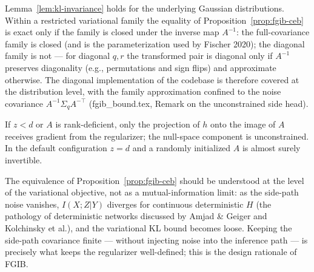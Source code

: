 \begin{remark}\label{rem:closure}
Lemma~\ref{lem:kl-invariance} holds for the underlying Gaussian distributions. Within a
restricted variational family the equality of Proposition~\ref{prop:fgib-ceb} is exact
only if the family is closed under the inverse map $A^{-1}$: the full-covariance family
is closed (and is the parameterization used by Fischer 2020); the diagonal family is not
--- for diagonal $q, r$ the transformed pair is diagonal only if $A^{-1}$ preserves
diagonality (e.g., permutations and sign flips) and approximate otherwise. The diagonal
implementation of the codebase is therefore covered at the distribution level, with the
family approximation confined to the noise covariance $A^{-1}\Sigma_q A^{-\top}$
(fgib\_bound.tex, Remark on the unconstrained side head).
\end{remark}

\begin{remark}\label{rem:rank}
If $z < d$ or $A$ is rank-deficient, only the projection of $h$ onto the image of $A$
receives gradient from the regularizer; the null-space component is unconstrained.
In the default configuration $z = d$ and a randomly initialized $A$ is almost surely invertible.
\end{remark}

\begin{remark}\label{rem:limit}
The equivalence of Proposition~\ref{prop:fgib-ceb} should be understood at the level of the
variational objective, not as a mutual-information limit: as the side-path noise vanishes,
$I(X;Z|Y)$ diverges for continuous deterministic $H$ (the pathology of deterministic
networks discussed by Amjad \& Geiger and Kolchinsky et al.), and the variational KL bound
becomes loose. Keeping the side-path covariance finite --- without injecting noise into the
inference path --- is precisely what keeps the regularizer well-defined; this is the design
rationale of FGIB.
\end{remark}
